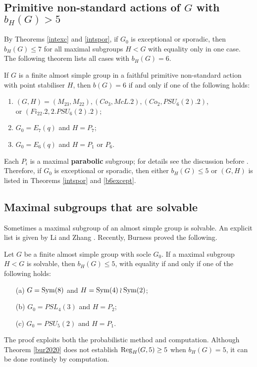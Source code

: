 \medskip

\subsection*{Primitive non-standard actions of $G$ with $b_H(G)>5$}

By Theorems \ref{intexc} and \ref{intspor}, if $G_0$ is exceptional or sporadic, then $b_H(G)\le 7$ for all maximal subgroups $H <G$ with equality only in one case. The following theorem lists all cases with $b_H(G)=6.$  

\begin{Th}
\label{b6except}
If $G$ is a finite almost simple  group in a faithful primitive non-standard action with point stabiliser $H$, then $b(G) = 6$ if and only if one of
the following holds:
\begin{enumerate}[font=\normalfont]
\item $(G, H) = (M_{23}, M_{22}), (Co_3, McL.2), (Co_2,PSU_6(2).2)$,\\
or $(Fi_{22}.2, 2.PSU_6(2).2);$
\item $G_0 = E_7(q)$ and $H = P_7$;
\item $G_0 = E_6(q)$ and $H = P_1$ or $P_6$.
\end{enumerate}
\end{Th} 
  Each $P_i$ is a maximal {\bf parabolic} subgroup; for details see the discussion before \cite[Theorem 3]{bls}. Therefore,  if $G_0$ is exceptional or sporadic, then either $b_H(G) \le 5$ or $(G,H)$ is listed in Theorems \ref{intspor}  and \ref{b6except}.


\subsection*{Maximal subgroups that are solvable}

Sometimes a maximal subgroup of an almost simple group is solvable.  An explicit list is given by Li and Zhang \cite{maxsolprim}. Recently, Burness \cite{burPS} proved the following.
\begin{Th}
\label{bur2020}
Let $G$ be a finite almost simple  group with socle $G_0$. If a maximal subgroup $H <G $ is solvable, then
  $b_H(G) \le 5$, with equality if and only if one of the following holds:
\begin{itemize}
\item[(a)] $G = \mathrm{Sym} (8)$ and $H = \mathrm{Sym}(4) \wr \mathrm{Sym} (2)$;
\item[(b)] $G_0 = PSL_4(3)$ and $H=P_2$;
\item[(c)] $G_0 = PSU_5(2)$ and $H = P_1$.
\end{itemize}
\end{Th}
The proof exploits both the probabilistic method and computation. Although Theorem \ref{bur2020} does not establish $\mathrm{Reg}_H(G,5)\ge 5$  when $b_H(G)=5$, it can be done routinely by computation.



